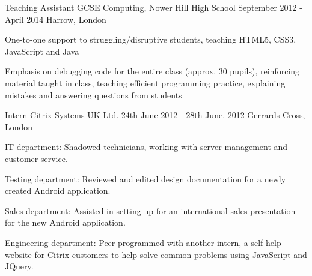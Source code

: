 \begin{cventries}
  \cventry
    {Teaching Assistant} %
    {GCSE Computing, Nower Hill High School} %
    {September 2012 - April 2014} %
    {Harrow, London} %
    {
      \begin{cvitems} %
        \item {One-to-one support to struggling/disruptive students, teaching HTML5, CSS3, JavaScript and Java}
        \item {Emphasis on debugging code for the entire class (approx. 30 pupils), reinforcing material taught in class, teaching efficient programming practice, explaining mistakes and answering questions from students}
      \end{cvitems}
    }

  \cventry
    {Intern} %
    {Citrix Systems UK Ltd.} %
    {24th June 2012 - 28th June. 2012} %
    {Gerrards Cross, London} %
    {
      \begin{cvitems} %
        \item {IT department: Shadowed technicians, working with server management and customer service.}
        \item {Testing department: Reviewed and edited design documentation for a newly created Android application.}
        \item {Sales department: Assisted in setting up for an international sales presentation for the new Android application.}
        \item {Engineering department: Peer programmed with another intern, a self-help website for Citrix customers to help solve common problems using JavaScript and JQuery.}
      \end{cvitems}
    }

\end{cventries}
